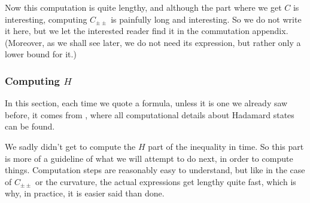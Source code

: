 \documentclass[a4paper,11pt]{article}
\numberwithin{equation}{section}
\theoremstyle{definition}
\begin{document}
Now this computation is quite lengthy, and although the part where we get $C$ is interesting, computing $C_{\pm\pm}$ is painfully long and interesting. So we do not write it here, but we let the interested reader find it in the commutation appendix. (Moreover, as we shall see later, we do not need its expression, but rather only a lower bound for it.)


\subsubsection{Computing $H$}
In this section, each time we quote a formula, unless it is one we already saw before, it comes from \cite{HadRen}, where all computational details about Hadamard states can be found.

We sadly didn't get to compute the $H$ part of the inequality in time. So this part is more of a guideline of what we will attempt to do next, in order to compute things. Computation steps are reasonably easy to understand, but like in the case of $C_{\pm\pm}$ or the curvature, the actual expressions get lengthy quite fast, which is why, in practice, it is easier said than done.
\end{document}
